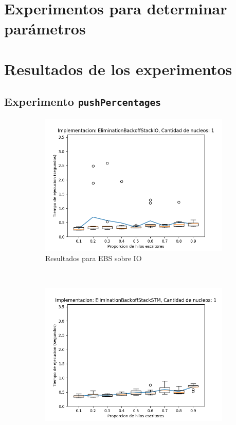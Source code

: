 \begin{appendices}
\chapter{Experimentos para determinar parámetros}
\chapter{Resultados de los experimentos}
\section{Experimento \texttt{pushPercentages}}\label{app-pushPercentages}

\begin{figure}[H]
    \centering
    \begin{subfigure}[b]{0.49\textwidth}
        \includegraphics[width=\textwidth]{images/pushPercentages/plots/expEBSIO-1}
        \caption{Resultados para EBS sobre IO}
        \label{subfig:pushPercentages-ebsio-1}
    \end{subfigure}
    ~
    \begin{subfigure}[b]{0.49\textwidth}
        \includegraphics[width=\textwidth]{images/pushPercentages/plots/expEBSSTM-1}

\end{subfigure}
\end{figure}
\end{appendices}
